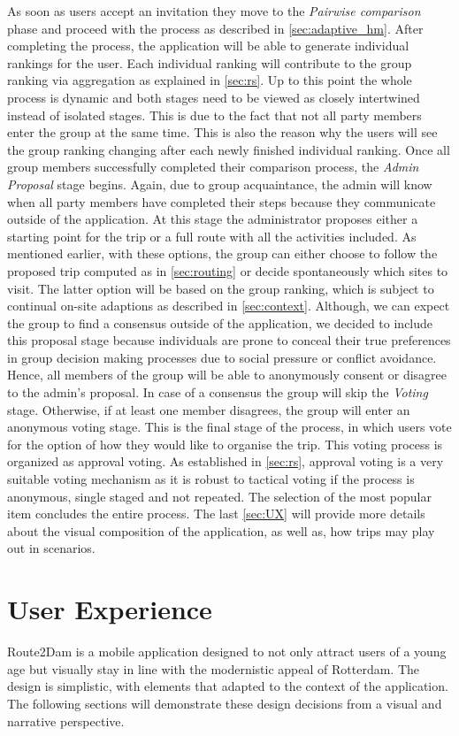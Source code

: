 \documentclass[11pt,a4paper,oneside]{article}
\begin{document}
As soon as users accept an invitation they move to the \emph{Pairwise comparison} phase and proceed with the process as described in \autoref{sec:adaptive_hm}. After completing the process, the application will be able to generate individual rankings for the user. Each individual ranking will contribute to the group ranking via aggregation as explained in \autoref{sec:rs}. Up to this point the whole process is dynamic and both stages need to be viewed as closely intertwined instead of isolated stages. This is due to the fact that not all party members enter the group at the same time. This is also the reason why the users will see the group ranking changing after each newly finished individual ranking. Once all group members successfully completed their comparison process, the \emph{Admin Proposal} stage begins. Again, due to group acquaintance, the admin will know when all party members have completed their steps because they communicate outside of the application. At this stage the administrator proposes either a starting point for the trip or a full route with all the activities included. As mentioned earlier, with these options, the group can either choose to follow the proposed trip computed as in \autoref{sec:routing} or decide spontaneously which sites to visit. The latter option will be based on the group ranking, which is subject to continual on-site adaptions as described in \autoref{sec:context}. Although, we can expect the group to find a consensus outside of the application, we decided to include this proposal stage because individuals are prone to conceal their true preferences in group decision making processes due to social pressure or conflict avoidance. Hence, all members of the group will be able to anonymously consent or disagree to the admin's proposal. In case of a consensus the group will skip the \emph{Voting} stage. Otherwise, if at least one member disagrees, the group will enter an anonymous voting stage. This is the final stage of the process, in which users vote for the option of how they would like to organise the trip. This voting process is organized as approval voting. As established in \autoref{sec:rs}, approval voting is a very suitable voting mechanism as it is robust to tactical voting if the process is anonymous, single staged and not repeated. The selection of the most popular item concludes the entire process. The last \autoref{sec:UX} will provide more details about the visual composition of the application, as well as, how trips may play out in scenarios.  

\section{User Experience}
\label{sec:UX}
Route2Dam is a mobile application designed to not only attract users of a young age but visually stay in line with the modernistic appeal of Rotterdam. The design is simplistic, with elements that adapted to the context of the application. The following sections will demonstrate these design decisions from a visual and narrative perspective.
\end{document}
